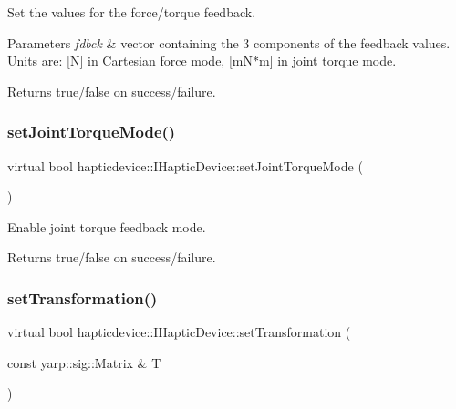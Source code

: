 Set the values for the force/torque feedback. 


\begin{DoxyParams}{Parameters}
{\em fdbck} & vector containing the 3 components of the feedback values. Units are\+: \mbox{[}N\mbox{]} in Cartesian force mode, \mbox{[}m\+N$\ast$m\mbox{]} in joint torque mode. \\
\hline
\end{DoxyParams}
\begin{DoxyReturn}{Returns}
true/false on success/failure. 
\end{DoxyReturn}
\label{classhapticdevice_1_1IHapticDevice_a1246d82f600bcf16118b0be5f4a7087e} 
\subsubsection{\texorpdfstring{set\+Joint\+Torque\+Mode()}{setJointTorqueMode()}}
{\footnotesize\ttfamily virtual bool hapticdevice\+::\+I\+Haptic\+Device\+::set\+Joint\+Torque\+Mode (\begin{DoxyParamCaption}{ }\end{DoxyParamCaption})\hspace{0.3cm}{\ttfamily [pure virtual]}}



Enable joint torque feedback mode. 

\begin{DoxyReturn}{Returns}
true/false on success/failure. 
\end{DoxyReturn}
\label{classhapticdevice_1_1IHapticDevice_aef306f97632c1ddb0eb39383000616f4} 
\subsubsection{\texorpdfstring{set\+Transformation()}{setTransformation()}}
{\footnotesize\ttfamily virtual bool hapticdevice\+::\+I\+Haptic\+Device\+::set\+Transformation (\begin{DoxyParamCaption}\item[{const yarp\+::sig\+::\+Matrix \&}]{T }\end{DoxyParamCaption})\hspace{0.3cm}{\ttfamily [pure virtual]}}



